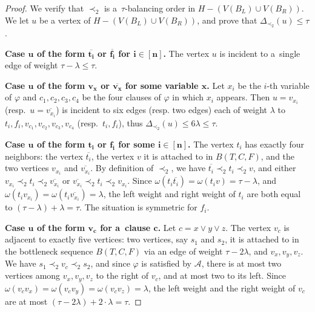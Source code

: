 \documentclass[a4paper,UKenglish,cleveref,hyperref,autoref]{lipics-v2021}
\newcommand{\weight}{\omega}
\begin{document}
\begin{proof}
\medskip

We verify that $\prec_2$ is a~$\tau$-balancing order in $H - (V(B_L) \cup V(B_R))$.
We let $u$ be a vertex of $H - (V(B_L) \cup V(B_R))$, and prove that $\Delta_{\prec_2}(u) \leqslant \tau$.

\medskip

\textbf{Case $\bm{u}$ of the form $\bm{\overline{t_i}}$ or $\bm{\overline{f_i}}$ for $\bm{i \in [n]}$.}
The vertex $u$ is incident to a~single edge of weight $\tau - \lambda \leqslant \tau$.

\medskip

\textbf{Case $\bm{u}$ of the form $\bm{v_x}$ or $\bm{\overline{v_x}}$ for some variable $\bm{x}$.}
Let $x_i$ be the $i$-th variable of $\varphi$ and $c_1, c_2, c_3, c_4$ be the four clauses of $\varphi$ in which $x_i$ appears.
Then $u = v_{x_i}$ (resp.~$u = \overline{v_{x_i}}$) is incident to six edges (resp. two edges) each of weight $\lambda$ to $t_i, f_i, v_{c_1}, v_{c_2}, v_{c_3}, v_{c_4}$ (resp.~$t_i, f_i$), thus $\Delta_{\prec_2}(u) \leqslant 6 \lambda \leqslant \tau$. 

\medskip

\textbf{Case $\bm{u}$ of the form $\bm{t_i}$ or $\bm{f_i}$ for some $\bm{i \in [n]}$.}
The vertex $t_i$ has exactly four neighbors: the vertex $\overline{t_i}$, the vertex $v$ it is attached to in $B(T,C,F)$, and the two vertices $v_{x_i}$ and $\overline{v_{x_i}}$.
By definition of $\prec_2$, we have $\overline{t_i} \prec_2 t_i \prec_2 v$, and either $v_{x_i} \prec_2 t_i \prec_2 \overline{v_{x_i}}$ or $\overline{v_{x_i}} \prec_2 t_i \prec_2 v_{x_i}$.
Since $\weight(t_i \overline{t_i}) = \weight(t_i v) = \tau - \lambda$, and $\weight(t_i v_{x_i}) = \weight (t_i \overline{v_{x_i}}) = \lambda$, the left weight and right weight of $t_i$ are both equal to $(\tau-\lambda)+\lambda=\tau$.
The situation is symmetric for $f_i$.

\medskip

\textbf{Case $\bm{u}$ of the form $\bm{v_c}$ for a~clause $\bm{c}$.}
Let $c = x \lor y \lor z$.
The vertex $v_c$ is adjacent to exactly five vertices: two vertices, say $s_1$ and $s_2$, it is attached to in the bottleneck sequence $B(T,C,F)$ via an edge of weight $\tau - 2 \lambda$, and $v_x, v_y, v_z$.
We have $s_1 \prec_2 v_c \prec_2 s_2$, and since $\varphi$ is satisfied by $\mathcal A$, there is at most two vertices among $v_x, v_y, v_z$ to the right of $v_c$, and at most two to its left.
Since $\weight (v_cv_x) = \weight (v_cv_y) = \weight (v_cv_z) = \lambda$, the left weight and the right weight of $v_c$ are at most $(\tau - 2\lambda) + 2\cdot \lambda = \tau$.


\end{proof}
\end{document}
